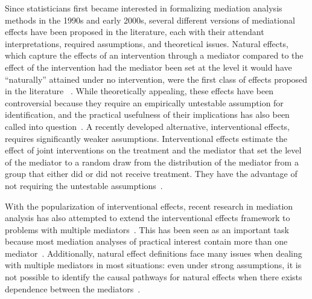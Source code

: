 Since statisticians first became interested in formalizing mediation analysis methods in the 1990s 
and early 2000s, several different versions of mediational effects have been proposed in the literature,
each with their attendant interpretations, required assumptions, and theoretical issues. Natural effects, 
which capture the effects of an intervention through a mediator compared to the 
effect of the intervention had the mediator been set at the level it would have ``naturally'' 
attained under no intervention, were the first class of effects proposed in the literature
~\citep{robinsgreenland1992, pearl2001, avinetal2005}. While theoretically appealing, these 
effects have been controversial because they require an empirically untestable
assumption for identification, and the practical usefulness of their implications has also 
been called into question~\citep{vanderweelevansteelandt2009}. 
A recently developed alternative, interventional
effects, requires significantly weaker assumptions. Interventional effects estimate the 
effect of joint interventions on the treatment and the mediator that set the level of the mediator to a 
random draw from the distribution of the mediator from a group that either did or did not receive 
treatment. They have the advantage of not requiring the 
untestable assumptions~\citep{vanderweeleetal2014}. 

With the popularization of interventional effects, recent research in mediation analysis has also 
attempted to extend the interventional effects framework to problems with multiple 
mediators~\citep{vanderweeletchetgentchetgen2017, linvanderweele2017, vansteelandtdaniel2017}. This has 
been seen as an important task because most mediation analyses of practical interest contain more than
one mediator~\citep{vansteelandtdaniel2017}. Additionally, natural effect definitions face many issues 
when dealing with multiple mediators in most situations: even under strong assumptions, it is not 
possible to identify the causal pathways for natural effects when there exists dependence between
the mediators~\citep{avinetal2005, vanderweeleetal2014}. 

